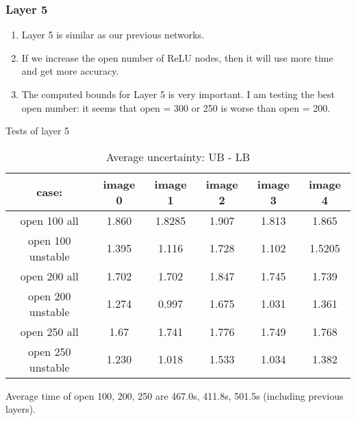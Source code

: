\documentclass[10pt,table, UTF8]{beamer}
\theoremstyle{mydef}
\numberwithin{equation}{section}
\begin{document}
\begin{frame}
	\frametitle{Layer 5}
	
	
	\begin{enumerate}
		\item Layer 5 is similar as our previous networks.
		
		\vspace*{2ex}
		
		\item  If we increase the open number of ReLU nodes, then it will use more time and get more accuracy.
		
		
		\vspace*{2ex}
		
		\item  The computed bounds for Layer 5 is very important. I am testing the best open number: it seems that open = 300 or 250 is worse than open = 200.
	\end{enumerate}
	
	
\end{frame}

\begin{frame}{Tests of layer 5}
	\begin{table}[htbp]
		\centering
		\caption{Average uncertainty: UB - LB}
		\begin{tabular}{|c|c|c|c|c|c|}
			\hline
			case: &image 0 & image 1 & image 2 & image 3 & image 4 \\
			\hline
			open 100 all & 1.860 & 1.8285 & 1.907 & 1.813 & 1.865 \\
			open 100 unstable & 1.395 & 1.116 & 1.728 & 1.102 & 1.5205 \\
			\hline
			open 200 all & 1.702 & 1.702 & 1.847 & 1.745 & 1.739 \\
			open 200 unstable & 1.274 & 0.997 & 1.675 & 1.031 & 1.361 \\
			\hline
			open 250 all & 1.67 & 1.741 & 1.776 & 1.749 & 1.768\\
			open 250 unstable & 1.230 & 1.018 & 1.533 & 1.034 & 1.382 \\
			\hline
		\end{tabular}
	\end{table}
	
	Average time of open 100, 200, 250 are 467.0s, 411.8s, 501.5s (including previous layers).

\end{frame}
\end{document}
